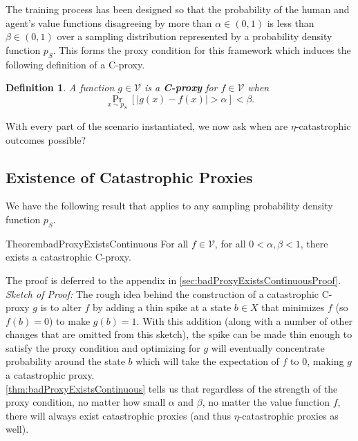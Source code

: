 \documentclass{article}
\newtheorem{Definition}{Definition}[section] \crefname{Definition}{Definition}{Definitions}
\begin{document}
The training process has been designed so that the probability of the human and agent's value functions disagreeing by more than $\alpha \in (0,1)$ is less than $\beta \in (0,1)$ over a sampling distribution represented by a probability density function $p_S$. This forms the proxy condition for this framework which induces the following definition of a C-proxy.

\begin{Definition}\label{def:continuousProxy}
A function $g \in \mathcal V$ is a \textbf{C-proxy} for $f \in \mathcal V$ when
$$\Pr_{x \sim p_S}[|g(x) - f(x)| > \alpha] < \beta.$$
\end{Definition}

With every part of the scenario instantiated, we now ask when are $\eta$-catastrophic outcomes possible?

\subsection{Existence of Catastrophic Proxies}
We have the following result that applies to any sampling probability density function $p_S$.

\begin{restatable}{Theorem}{badProxyExistsContinuous}\label{thm:badProxyExistsContinuous}
For all $f \in \mathcal{V}$, for all $0<\alpha, \beta < 1$, there exists a catastrophic C-proxy.
\end{restatable}

The proof is deferred to the appendix in \cref{sec:badProxyExistsContinuousProof}.\\

\textit{Sketch of Proof:}
The rough idea behind the construction of a catastrophic C-proxy $g$ is to alter $f$ by adding a thin spike at a state $b \in X$ that minimizes $f$ (so $f(b) = 0$) to make $g(b) = 1$. With this addition (along with a number of other changes that are omitted from this sketch), the spike can be made thin enough to satisfy the proxy condition and optimizing for $g$ will eventually concentrate probability around the state $b$ which will take the expectation of $f$ to 0, making $g$ a catastrophic proxy.\\

\cref{thm:badProxyExistsContinuous} tells us that regardless of the strength of the proxy condition, no matter how small $\alpha$ and $\beta$, no matter the value function $f$, there will always exist catastrophic proxies (and thus $\eta$-catastrophic proxies as well).
\end{document}
